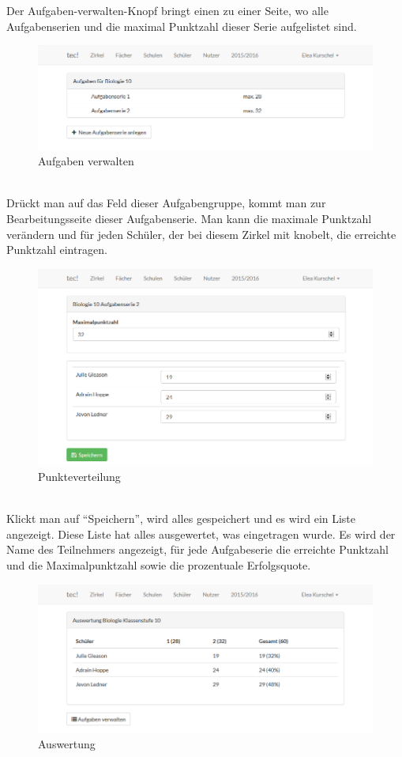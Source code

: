 \newpage Der Aufgaben-verwalten-Knopf bringt einen zu einer Seite, wo alle Aufgabenserien und die maximal Punktzahl dieser Serie aufgelistet sind.\\
\begin{figure}[ht]
	\centering
	\includegraphics[scale=.5]{bilder/Aufgaben_verwalten.png}
	\caption{Aufgaben verwalten}
\end{figure}
\\Drückt man auf das Feld dieser Aufgabengruppe, kommt man zur Bearbeitungsseite dieser Aufgabenserie. Man kann die maximale Punktzahl verändern und für jeden Schüler, der bei diesem Zirkel mit knobelt, die erreichte Punktzahl eintragen.\\
\begin{figure}[ht]
	\centering
	\includegraphics[scale=.5]{bilder/Aufgabenserie.png}
	\caption{Punkteverteilung}
\end{figure}
\\Klickt man auf "`Speichern"', wird alles gespeichert und es wird ein Liste angezeigt. Diese Liste hat alles ausgewertet, was eingetragen wurde. Es wird der Name des Teilnehmers angezeigt, für jede Aufgabeserie die erreichte Punktzahl und die Maximalpunktzahl sowie die prozentuale Erfolgsquote.\\
\begin{figure}[ht]
	\centering
	\includegraphics[scale=.5]{bilder/Auswertung.png}
	\caption{Auswertung}
\end{figure}
